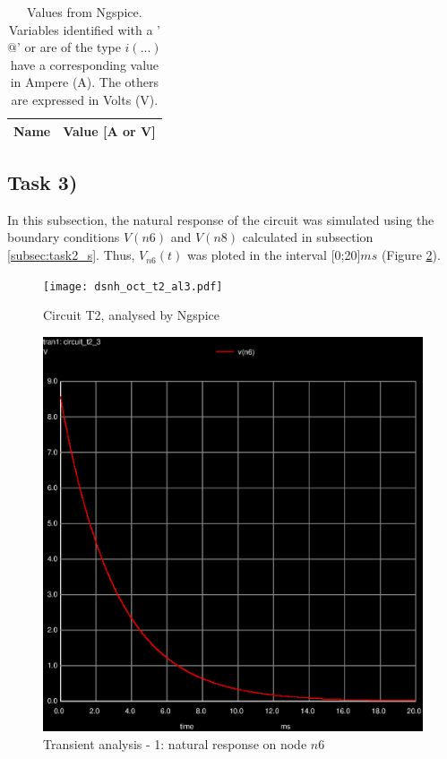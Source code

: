 \begin{table}[H]
	\centering
	\begin{tabular}{|l|r|}
		\hline    
		{\bf Name} & {\bf Value [A or V]} \\ \hline
    		
	\end{tabular}
	
	\caption{Values from Ngspice. Variables identified with a '$@$' or are of the type
	$i(...)$ have a corresponding value in Ampere (A). The others are expressed in Volts (V).}
    
\label{tab:op2}
\end{table}


\subsection{Task 3)}
\label{subsec:task3_s}

In this subsection, the natural response of the circuit was simulated using the boundary conditions
$V(n6)$ and $V(n8)$ calculated in subsection \ref{subsec:task2_s}. Thus, $V_{n6}(t)$ was ploted in the 
interval [0;20]$ms$ (Figure \ref{fig:trans-1}).

\begin{figure}[H]
	\centering
	\texttt{[image: dsnh\_oct\_t2\_al3.pdf]}
	\caption{Circuit T2, analysed by Ngspice}
\label{fig:Dsnh_sim_t2}
\end{figure}


\begin{figure}[H]
	\centering
	\includegraphics[width=0.4\linewidth]{trans-1.eps}
	\caption{Transient analysis - 1: natural response on node $n6$}
\label{fig:trans-1}
\end{figure}




